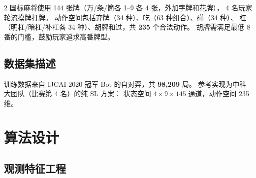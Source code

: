 \documentclass{article}
\begin{document}
\begin{multicols}{2}
国标麻将使用 144 张牌（万/条/筒各 1--9 各 4 张，外加字牌和花牌），
4 名玩家轮流摸牌打牌。
动作空间包括弃牌（34 种）、吃（63 种组合）、碰（34 种）、
杠（明杠/暗杠/补杠各 34 种）、胡牌和过，共 \textbf{235} 个合法动作。
胡牌需满足最低 8 番的门槛，鼓励玩家追求高番牌型。

\subsection{数据集描述}

训练数据来自 IJCAI 2020 冠军 Bot 的自对弈，共 \textbf{98,209} 局。
参考实现为中科大团队（比赛第 4 名）的纯 SL 方案：
状态空间 $4\times9\times145$ 通道，动作空间 235 维。

\section{算法设计}
\label{sec:method}

\subsection{观测特征工程}


\end{multicols}
\end{document}

